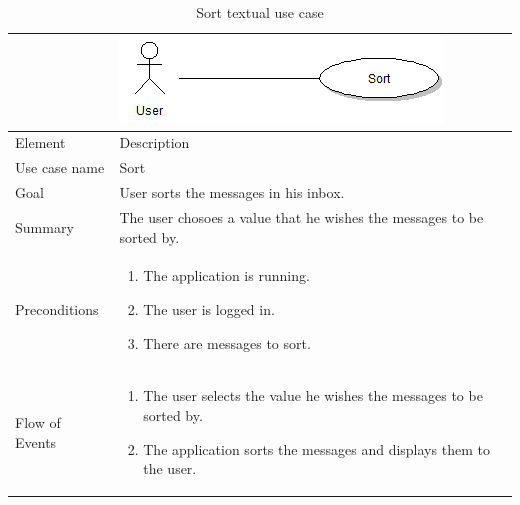 \begin{table}
\begin{tabular}{p{3cm}p{12cm}}
& \includegraphics{sort}\\ \hline
Element & Description \\ \hline
Use case name & Sort \\
Goal & User sorts the messages in his inbox. \\
Summary & The user chosoes a value that he wishes the messages to be sorted by. \\
Preconditions &
\begin{enumerate}
\item{}The application is running.
\item{}The user is logged in.
\item{}There are messages to sort.
\end{enumerate} \\ \hline
Flow of Events &
\begin{enumerate}
\item{}The user selects the value he wishes the messages to be sorted by.
\item{}The application sorts the messages and displays them to the user.
\end{enumerate}
\end{tabular}
\caption{Sort textual use case} \label{tab:search}
\end{table}

